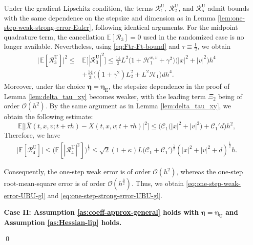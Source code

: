 \documentclass[12pt]{article}
\newenvironment{redtext}
  {\color{black}\ignorespaces}
  {\ignorespacesafterend}
\numberwithin{equation}{section}
\renewenvironment{proof}%
  {\begin{trivlist}%
   \item[]\ignorespaces}%
  {\qed\end{trivlist}}
\newcommand{\E}{\mathbb{E}}
\begin{document}
\begin{redtext}
\begin{proof}
Under the gradient Lipschitz condition, the terms $\mathcal R_1^\mathrm{U}$, $\mathcal R_2^\mathrm{U}$, and $\mathcal R_5^\mathrm{U}$ admit bounds with the same dependence on the stepsize and dimension as in Lemma \ref{lem:one-step-weak-strong-error-Euler}, following identical arguments.
%
For the midpoint quadrature term, the cancellation
$\mathbb E[\mathcal R_3]=0$ used in the randomized case is no longer
available. Nevertheless, using \eqref{eq:Ftr-Ft-bound} and
$\tau\equiv\frac12$, we obtain
\begin{align}
\bigl|\mathbb E[\mathcal R^{\mathrm{U}}_3]\bigr|^2
\leq&
\mathbb E\bigl[|\mathcal R^{\mathrm{U}}_3|^2\bigr]
\leq
\tfrac{14}{3}L^2
\bigl(
1+\mathscr H_1^{x,v}+\gamma^2
\bigr)
\bigl(
|x|^2+|v|^2
\bigr)h^4
\nonumber\\
&+
\tfrac{14}{3}
\Big(
(1+\gamma^2)L_2^2
+
L^2\mathscr H_1
\Big)dh^4.
\end{align}
Moreover, under the choice \(\boldsymbol{\eta}=\boldsymbol{\eta}_{\mathrm E}\), the stepsize dependence in the proof of Lemma \ref{lem:delta_tau_xy} becomes weaker, with the leading term \(\Xi_2\) being of order \(\mathcal O(h^2)\).
By the same argument as in Lemma \ref{lem:delta_tau_xy}, we obtain the following estimate:
\begin{equation}
\label{eq:delta-tau-x-bound-eta-E}
\mathbb{E}
\Big[
\big|
\bar{X}(t,x,v;t+\tau h)
-
X(t,x,v;t+\tau h)
\big|^2
\Big]
\leq
\Big(
\mathcal C_1
\big(
|x|^2+|v|^2
\big)
+
\mathcal C_1'd
\Big)h^2,
\end{equation}
Therefore, we have
\begin{align}
\big|
\E
\left[
\mathcal R_4^\mathrm{U}
\right]
\big|
\leq
\big(
\E
\left[
|\mathcal R_4^\mathrm{U}|^2
\right]
\big)^{\frac{1}{2}}
\leq
\sqrt{2}(1+\kappa)
L
\bigl(
\mathcal C_1+\mathcal C_1'
\bigr)^{\frac{1}{2}}
(|x|^2+|v|^2+d)^\frac{1}{2}h.
\end{align}



Consequently, the one-step weak error is of order $\mathcal O (h^2)$, whereas
the one-step root-mean-square error is of order $\mathcal O ( h^{\frac{3}{2}} )$. Thus,
we obtain \eqref{eq:one-step-weak-error-UBU-gl} and
\eqref{eq:one-step-strong-error-UBU-gl}.


\textbf{Case II: Assumption \ref{as:coeff-approx-general} holds with $\boldsymbol{\eta} = \boldsymbol{\eta}_\mathrm{U}$ and Assumption \ref{as:Hessian-lip} holds.}


\end{proof}
\end{redtext}
\end{document}
